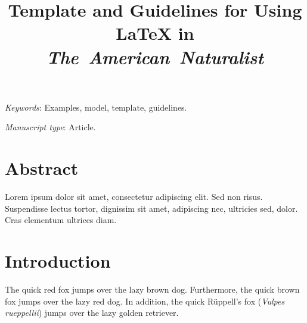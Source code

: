 \documentclass[11pt]{article}
\title{Template and Guidelines for Using \LaTeX{} in \textit{The~American~Naturalist} }
\author{}
\date{}
\begin{document}
\maketitle

%
%
%
%
%
%
%

\textit{Keywords}: Examples, model, template, guidelines.

\bigskip

\textit{Manuscript type}: Article. %

\bigskip



\newpage{}

\section*{Abstract}

Lorem ipsum dolor sit amet, consectetur adipiscing elit. Sed non risus. Suspendisse lectus tortor, dignissim sit amet, adipiscing nec, ultricies sed, dolor. Cras elementum ultrices diam.

\newpage{}

\section*{Introduction}


The quick red fox jumps over the lazy brown dog. Furthermore, the quick brown fox jumps over the lazy red dog. In addition, the quick R\"{u}ppell's fox (\textit{Vulpes rueppellii}) jumps over the lazy golden retriever.
\end{document}
